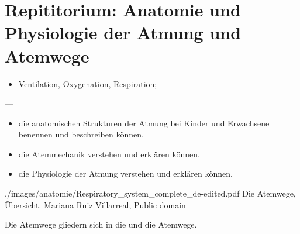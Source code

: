 \section{Repititorium: Anatomie und Physiologie der Atmung
und Atemwege}
\begin{itemize}
  \item Ventilation, Oxygenation, Respiration;
\end{itemize}
---
\begin{itemize}
   \item die anatomischen Strukturen der Atmung bei Kinder und
  Erwachsene benennen und beschreiben können. 
  \item die
  Atemmechanik verstehen und erklären können.
  
  \item die Physiologie der Atmung verstehen und erklären
  können.
\end{itemize}

 \label{topic:atemwege-lunge}



{}
{}
{./images/anatomie/Respiratory_system_complete_de-edited.pdf}
{Die Atemwege, Übersicht.\label{fig:respiraktionstrakt-uebersicht}}
{Mariana Ruiz Villarreal, Public domain}


Die Atemwege gliedern sich in die  und die
 Atemwege.

